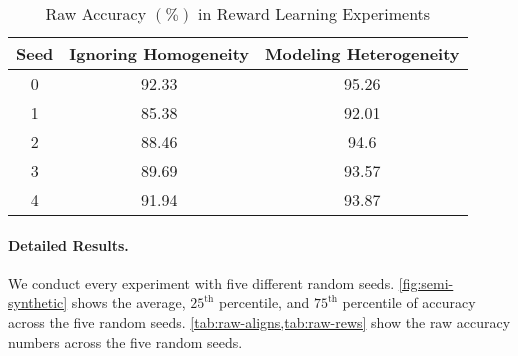\begin{table}
\caption{Raw Accuracy $(\%)$ in Reward Learning Experiments}
\label{tab:raw-rews}
\begin{center}
\begin{small}
\begin{sc}
\begin{tabular}{ccc}
\toprule
Seed & Ignoring Homogeneity & Modeling Heterogeneity \\
\midrule
0    &  92.33 & 95.26\\
1    &  85.38 & 92.01\\
2    &  88.46 & 94.6\\
3    &  89.69 & 93.57\\
4    &  91.94 & 93.87\\
\bottomrule
\end{tabular}
\end{sc}
\end{small}
\end{center}
\end{table}

\paragraph{Detailed Results.}
We conduct every experiment with five different random seeds.
\cref{fig:semi-synthetic} shows the average, $25^\text{th}$ percentile, and $75^\text{th}$ percentile of accuracy across the five random seeds.
\cref{tab:raw-aligns,tab:raw-rews} show the raw accuracy numbers across the five random seeds.